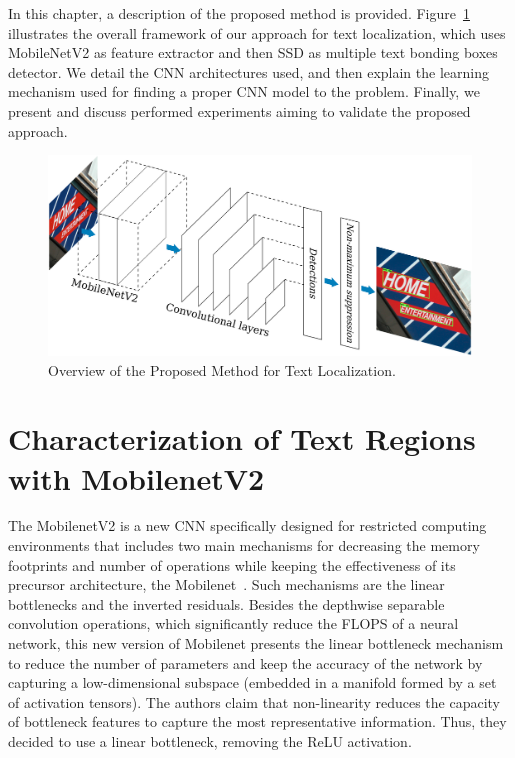 
In this chapter, a description of the proposed method is provided. Figure~\ref{fig:architecture} illustrates the overall framework of our approach for text localization, which uses MobileNetV2 as feature extractor and then SSD as multiple text bonding boxes detector. We detail the CNN architectures used, and then explain the learning mechanism used for finding a proper CNN model to the problem. Finally, we present and discuss performed experiments aiming to validate the proposed approach.

\begin{figure}[!ht]
	\centering
	\includegraphics[width=\columnwidth]{ICIP_frankenstein/figs/proposed-method-overview.pdf}
	\caption{Overview of the Proposed Method for Text Localization.}
	\label{fig:architecture}
\end{figure}

\section{Characterization of Text Regions with MobilenetV2}

The MobilenetV2 is a new CNN specifically designed for restricted computing environments that includes two main mechanisms for decreasing the memory footprints and number of operations while keeping the effectiveness of its precursor architecture, the Mobilenet~\cite{Sandler2018CVPR}. Such mechanisms are the linear bottlenecks and the inverted residuals. Besides the depthwise separable convolution operations, which significantly reduce the FLOPS of a neural network, this new version of Mobilenet presents the linear bottleneck mechanism to reduce the number of parameters and keep the accuracy of the network by capturing a low-dimensional subspace (embedded in a manifold formed by a set of activation tensors). The authors claim that non-linearity reduces the capacity of bottleneck features to capture the most representative information. Thus, they decided to use a linear bottleneck, removing the ReLU activation.

